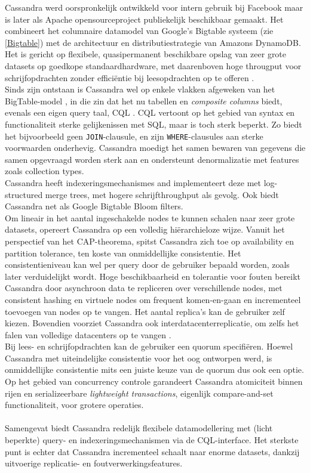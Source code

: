 Cassandra werd oorspronkelijk ontwikkeld voor intern gebruik bij Facebook maar is later als Apache opensourceproject publiekelijk beschikbaar gemaakt. Het combineert het columnaire datamodel van Google's Bigtable systeem (zie \ref{Bigtable}) met de architectuur en distributiestrategie van Amazons DynamoDB. Het is gericht op flexibele, quasipermanent beschikbare opslag van zeer grote datasets op goedkope standaardhardware, met daarenboven hoge througput voor schrijfopdrachten zonder effici\"entie bij leesopdrachten op te offeren \cite{borthakur2011apache}.\\
Sinds zijn ontstaan is Cassandra wel op enkele vlakken afgeweken van het BigTable-model \cite{cassandra_then&now}, in die zin dat het nu tabellen en \textit{composite columns} biedt, evenals een eigen query taal, CQL \cite{cassandra_CQL}. CQL vertoont op het gebied van syntax en functionaliteit sterke gelijkenissen met SQL, maar is toch sterk beperkt. Zo biedt het bijvoorbeeld geen \texttt{JOIN}-clausule, en zijn \texttt{WHERE}-clausules aan sterke voorwaarden onderhevig. Cassandra moedigt het samen bewaren van gegevens die samen opgevraagd worden sterk aan en ondersteunt denormalizatie met features zoals collection types.\\
Cassandra heeft indexeringsmechanismes and implementeert deze met log-structured merge trees, met hogere schrijfthroughput als gevolg. Ook biedt Cassandra net als Google Bigtable Bloom filters.\\
Om lineair in het aantal ingeschakelde nodes te kunnen schalen naar zeer grote datasets, opereert Cassandra op een volledig hi\"erarchieloze wijze. Vanuit het perspectief van het CAP-theorema, spitst Cassandra zich toe op availability en partition tolerance, ten koste van onmiddellijke consistentie. Het consistentieniveau kan wel per query door de gebruiker bepaald worden, zoals later verduidelijkt wordt. Hoge beschikbaarheid en tolerantie voor fouten bereikt Cassandra door asynchroon data te repliceren over verschillende nodes, met consistent hashing en virtuele nodes om frequent komen-en-gaan en incrementeel toevoegen van nodes op te vangen. Het aantal replica's kan de gebruiker zelf kiezen. Bovendien voorziet Cassandra ook interdatacenterreplicatie, om zelfs het falen van volledige datacenters op te vangen \cite{decandia2007dynamo} \cite{lakshman2010cassandra} \cite{cassandra_then&now}.\\
Bij lees- en schrijfopdrachten kan de gebruiker een quorum specifi\"eren. Hoewel Cassandra met uiteindelijke consistentie voor het oog ontworpen werd, is onmiddellijke consistentie mits een juiste keuze van de quorum dus ook een optie.\\
Op het gebied van concurrency controle garandeert Cassandra atomiciteit binnen rijen en serializeerbare \textit{lightweight transactions}, eigenlijk compare-and-set functionaliteit, voor grotere operaties.
\\\\
Samengevat biedt Cassandra redelijk flexibele datamodellering met (licht beperkte) query- en indexeringsmechanismen via de CQL-interface. Het sterkste punt is echter dat Cassandra incrementeel schaalt naar enorme datasets, dankzij uitvoerige replicatie- en foutverwerkingsfeatures.

